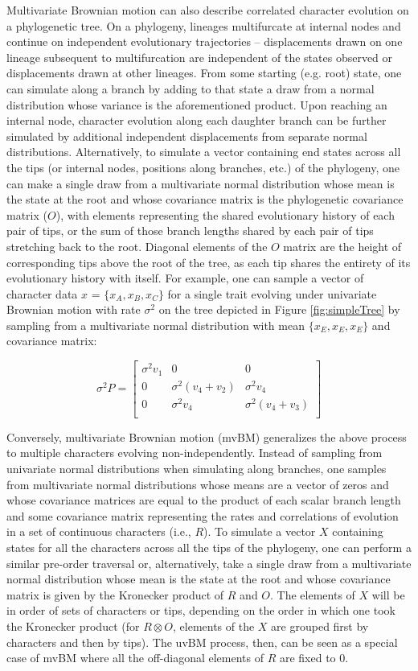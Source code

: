Multivariate Brownian motion can also describe correlated character evolution on a phylogenetic tree. On a phylogeny, lineages multifurcate at internal nodes and continue on independent evolutionary trajectories –  displacements drawn on one lineage subsequent to multifurcation are independent of the states observed or displacements drawn at other lineages. From some starting (e.g. root) state, one can simulate along a branch by adding to that state a draw from a normal distribution whose variance is the aforementioned product. Upon reaching an internal node, character evolution along each daughter branch can be further simulated by additional independent displacements from separate normal distributions. Alternatively, to simulate a vector containing end states across all the tips (or internal nodes, positions along branches, etc.) of the phylogeny, one can make a single draw from a multivariate normal distribution whose mean is the state at the root and whose covariance matrix is the phylogenetic covariance matrix ($O$), with elements representing the shared evolutionary history of each pair of tips, or the sum of those branch lengths shared by each pair of tips stretching back to the root. Diagonal elements of the $O$ matrix are the height of corresponding tips above the root of the tree, as each tip shares the entirety of its evolutionary history with itself. For example, one can sample a vector of character data $x$ = $\{x_A, x_B, x_C\}$ for a single trait evolving under univariate Brownian motion with rate $\sigma^2$ on the tree depicted in Figure \ref{fig:simpleTree} by sampling from a multivariate normal distribution with mean $\{x_E, x_E, x_E\}$ and covariance matrix:

{\large\[\sigma^{2}P = \begin{bmatrix}
\sigma^{2}v_1 & 0 & 0 \\
0 & \sigma^{2}(v_4 + v_2) & \sigma^{2}v_4 \\
0 & \sigma^{2}v_4 & \sigma^{2}(v_4 + v_3) \\
\end{bmatrix}\]}

Conversely, multivariate Brownian motion (mvBM) generalizes the above process to multiple characters evolving non-independently. Instead of sampling from univariate normal distributions when simulating along branches, one samples from multivariate normal distributions whose means are a vector of zeros and whose covariance matrices are equal to the product of each scalar branch length and some covariance matrix representing the rates and correlations of evolution in a set of continuous characters (i.e., $R$). To simulate a vector $X$ containing states for all the characters across all the tips of the phylogeny, one can perform a similar pre-order traversal or, alternatively, take a single draw from a multivariate normal distribution whose mean is the state at the root and whose covariance matrix is given by the Kronecker product of $R$ and $O$. The elements of $X$ will be in order of sets of characters or tips, depending on the order in which one took the Kronecker product (for $R \otimes O$, elements of the $X$ are grouped first by characters and then by tips). The uvBM process, then, can be seen as a special case of mvBM where all the off-diagonal elements of $R$ are fixed to 0.


